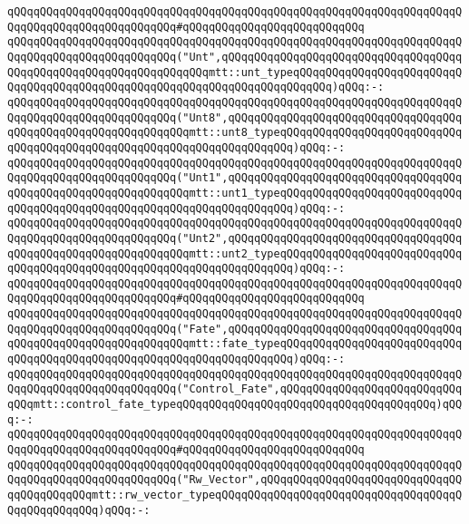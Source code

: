 \verb|qQQqqQQqqQQqqQQqqQQqqQQqqQQqqQQqqQQqqQQqqQQqqQQqqQQqqQQqqQQqqQQqqQQqqQQqqQQqqQQqqQQqqQQqqQQqqQQq#qQQqqQQqqQQqqQQqqQQqqQQqqQQq|\newline
\verb|qQQqqQQqqQQqqQQqqQQqqQQqqQQqqQQqqQQqqQQqqQQqqQQqqQQqqQQqqQQqqQQqqQQqqQQqqQQqqQQqqQQqqQQqqQQqqQQq("Unt",qQQqqQQqqQQqqQQqqQQqqQQqqQQqqQQqqQQqqQQqqQQqqQQqqQQqqQQqqQQqqQQqqQQqmtt::unt_typeqQQqqQQqqQQqqQQqqQQqqQQqqQQqqQQqqQQqqQQqqQQqqQQqqQQqqQQqqQQqqQQqqQQqqQQqqQQq)qQQq:-:|\newline
\verb|qQQqqQQqqQQqqQQqqQQqqQQqqQQqqQQqqQQqqQQqqQQqqQQqqQQqqQQqqQQqqQQqqQQqqQQqqQQqqQQqqQQqqQQqqQQqqQQq("Unt8",qQQqqQQqqQQqqQQqqQQqqQQqqQQqqQQqqQQqqQQqqQQqqQQqqQQqqQQqqQQqqQQqmtt::unt8_typeqQQqqQQqqQQqqQQqqQQqqQQqqQQqqQQqqQQqqQQqqQQqqQQqqQQqqQQqqQQqqQQqqQQqqQQq)qQQq:-:|\newline
\verb|qQQqqQQqqQQqqQQqqQQqqQQqqQQqqQQqqQQqqQQqqQQqqQQqqQQqqQQqqQQqqQQqqQQqqQQqqQQqqQQqqQQqqQQqqQQqqQQq("Unt1",qQQqqQQqqQQqqQQqqQQqqQQqqQQqqQQqqQQqqQQqqQQqqQQqqQQqqQQqqQQqqQQqmtt::unt1_typeqQQqqQQqqQQqqQQqqQQqqQQqqQQqqQQqqQQqqQQqqQQqqQQqqQQqqQQqqQQqqQQqqQQqqQQq)qQQq:-:|\newline
\verb|qQQqqQQqqQQqqQQqqQQqqQQqqQQqqQQqqQQqqQQqqQQqqQQqqQQqqQQqqQQqqQQqqQQqqQQqqQQqqQQqqQQqqQQqqQQqqQQq("Unt2",qQQqqQQqqQQqqQQqqQQqqQQqqQQqqQQqqQQqqQQqqQQqqQQqqQQqqQQqqQQqqQQqmtt::unt2_typeqQQqqQQqqQQqqQQqqQQqqQQqqQQqqQQqqQQqqQQqqQQqqQQqqQQqqQQqqQQqqQQqqQQqqQQq)qQQq:-:|\newline
\verb|qQQqqQQqqQQqqQQqqQQqqQQqqQQqqQQqqQQqqQQqqQQqqQQqqQQqqQQqqQQqqQQqqQQqqQQqqQQqqQQqqQQqqQQqqQQqqQQq#qQQqqQQqqQQqqQQqqQQqqQQqqQQq|\newline
\verb|qQQqqQQqqQQqqQQqqQQqqQQqqQQqqQQqqQQqqQQqqQQqqQQqqQQqqQQqqQQqqQQqqQQqqQQqqQQqqQQqqQQqqQQqqQQqqQQq("Fate",qQQqqQQqqQQqqQQqqQQqqQQqqQQqqQQqqQQqqQQqqQQqqQQqqQQqqQQqqQQqqQQqmtt::fate_typeqQQqqQQqqQQqqQQqqQQqqQQqqQQqqQQqqQQqqQQqqQQqqQQqqQQqqQQqqQQqqQQqqQQqqQQq)qQQq:-:|\newline
\verb|qQQqqQQqqQQqqQQqqQQqqQQqqQQqqQQqqQQqqQQqqQQqqQQqqQQqqQQqqQQqqQQqqQQqqQQqqQQqqQQqqQQqqQQqqQQqqQQq("Control_Fate",qQQqqQQqqQQqqQQqqQQqqQQqqQQqqQQqmtt::control_fate_typeqQQqqQQqqQQqqQQqqQQqqQQqqQQqqQQqqQQqqQQq)qQQq:-:|\newline
\verb|qQQqqQQqqQQqqQQqqQQqqQQqqQQqqQQqqQQqqQQqqQQqqQQqqQQqqQQqqQQqqQQqqQQqqQQqqQQqqQQqqQQqqQQqqQQqqQQq#qQQqqQQqqQQqqQQqqQQqqQQqqQQq|\newline
\verb|qQQqqQQqqQQqqQQqqQQqqQQqqQQqqQQqqQQqqQQqqQQqqQQqqQQqqQQqqQQqqQQqqQQqqQQqqQQqqQQqqQQqqQQqqQQqqQQq("Rw_Vector",qQQqqQQqqQQqqQQqqQQqqQQqqQQqqQQqqQQqqQQqqQQqmtt::rw_vector_typeqQQqqQQqqQQqqQQqqQQqqQQqqQQqqQQqqQQqqQQqqQQqqQQqqQQq)qQQq:-:|\newline
